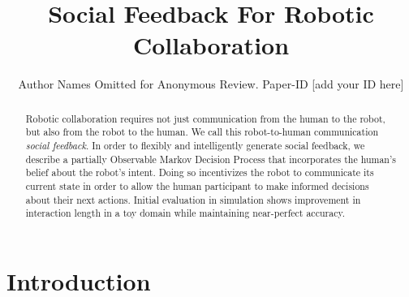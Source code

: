\documentclass[conference]{IEEEtran}
\begin{document}
\title{Social Feedback For Robotic Collaboration}
\author{Author Names Omitted for Anonymous Review. Paper-ID [add your ID here]}

\maketitle





\begin{abstract}
Robotic collaboration requires not just communication from the human to the robot, but also from the robot to the human. We call this robot-to-human communication \emph{social feedback}. In order to flexibly and intelligently generate social feedback, we describe a partially Observable Markov Decision Process that incorporates the human's belief about the robot's intent. Doing so incentivizes the robot to communicate its current state in order to allow the human participant to make informed decisions about their next actions. Initial evaluation in simulation shows improvement in interaction length in a toy domain while maintaining near-perfect accuracy. 
\end{abstract}

	
\section{Introduction}
\end{document}
